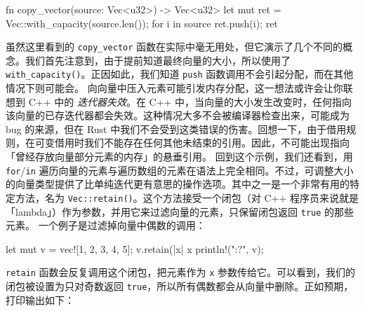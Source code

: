 \begin{codebox}[rust]
fn copy_vector(source: Vec<u32>) -> Vec<u32> {
    let mut ret = Vec::with_capacity(source.len());
    for i in source {
        ret.push(i);
    }
    ret
}
\end{codebox}
虽然这里看到的 \texttt{copy\_\allowbreak{}vector} 函数在实际中毫无用处，但它演示了几个不同的概念。我们首先注意到，由于提前知道最终向量的大小，所以使用了 \texttt{with\_\allowbreak{}capacity(\allowbreak{})\allowbreak{}}。正因如此，我们知道 \texttt{push} 函数调用不会引起分配，而在其他情况下则可能会。
向向量中压入元素可能引发内存分配，这一想法或许会让你联想到 C++ 中的 \emph{迭代器失效}。在 C++ 中，当向量的大小发生改变时，任何指向该向量的已存迭代器都会失效。这种情况大多不会被编译器检查出来，可能成为 bug 的来源，但在 Rust 中我们不会受到这类错误的伤害。回想一下，由于借用规则，在可变借用时我们不能存在任何其他未结束的引用。因此，不可能出现指向「曾经存放向量部分元素的内存」的悬垂引用。
\label{idx:idx_dbcbb8e7}
回到这个示例，我们还看到，用 \texttt{for}/\texttt{in} 遍历向量的元素与遍历数组的元素在语法上完全相同。不过，可调整大小的向量类型提供了比单纯迭代更有意思的操作选项。其中之一是一个非常有用的特定方法，名为 \texttt{Vec::\allowbreak{}retain(\allowbreak{})\allowbreak{}}。这个方法接受一个闭包（对 C++ 程序员来说就是「lambda」）作为参数，并用它来过滤向量的元素，只保留闭包返回 \texttt{true} 的那些元素。
一个例子是过滤掉向量中偶数的调用：
\begin{codebox}[rust]
let mut v = vec![1, 2, 3, 4, 5];
v.retain(|x| x %
println!("{:?}", v);
\end{codebox}
\label{idx:idx_a455faaa}
\texttt{retain} 函数会反复调用这个闭包，把元素作为 \texttt{x} 参数传给它。可以看到，我们的闭包被设置为只对奇数返回 \texttt{true}，所以所有偶数都会从向量中删除。正如预期，打印输出如下：
\begin{codeboxdark}
[1, 3, 5]
\end{codeboxdark}
